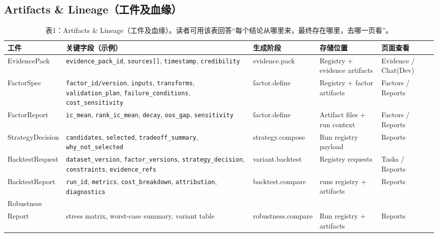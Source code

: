 \documentclass{article}
\newcommand{\tok}[1]{\nolinkurl{#1}}
\begin{document}
\subsection{Artifacts \& Lineage（工件及血缘）}
\begin{table}[t]
\centering
\scriptsize
\setlength{\tabcolsep}{4pt}
\begin{tabularx}{\textwidth}{p{2.2cm}p{3.9cm}p{2.4cm}p{2.7cm}X}
\toprule
工件 & 关键字段（示例） & 生成阶段 & 存储位置 & 页面查看 \\
\midrule
EvidencePack & \tok{evidence_pack_id}, \tok{sources[]}, \tok{timestamp}, \tok{credibility} & evidence.pack & Registry + evidence \mbox{artifacts} & Evidence / Chat(Dev) \\
FactorSpec & \tok{factor_id/version}, \tok{inputs}, \tok{transforms}, \tok{validation_plan}, \tok{failure_conditions}, \tok{cost_sensitivity} & factor.define & Registry + factor artifacts & Factors / Reports \\
FactorReport & \tok{ic_mean}, \tok{rank_ic_mean}, \tok{decay}, \tok{oos_gap}, \tok{sensitivity} & factor.define & Artifact files + run context & Factors / Reports \\
StrategyDecision & \tok{candidates}, \tok{selected}, \tok{tradeoff_summary}, \tok{why_not_selected} & strategy.compose & Run registry payload & Reports \\
BacktestRequest & \tok{dataset_version}, \tok{factor_versions}, \tok{strategy_decision}, \tok{constraints}, \tok{evidence_refs} & variant.backtest & Registry requests & Tasks / Reports \\
BacktestReport & \tok{run_id}, \tok{metrics}, \tok{cost_breakdown}, \tok{attribution}, \tok{diagnostics} & backtest.compare & runs registry + \mbox{artifacts} & Reports \\
Robustness\\Report & stress \mbox{matrix}, worst-case summary, variant table & robustness.compare & Run registry + \mbox{artifacts} & Reports \\
\bottomrule
\end{tabularx}
\caption{表1：Artifacts \& Lineage（工件及血缘）。读者可用该表回答“每个结论从哪里来，最终存在哪里，去哪一页看”。}
\label{tab:artifacts-lineage}
\end{table}
\end{document}
